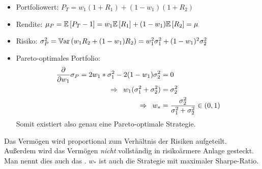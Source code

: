 \begin{description}
	\begin{itemize}
		\item Portfoliowert: $P_T = w_1 (1+R_1) + (1-w_1)(1+R_2)$
		\item Rendite: $\mu_P = \EW[P_T - 1] = w_1 \EW[R_1] + (1-w_1) \EW[R_2] = \mu$
		\item Risiko: $\sigma_P^2 = \Var[w_1 R_2 + (1-w_1) R_2] = w_1^2 \sigma_1^2 + (1-w_1)^2 \sigma_2^2$
		\item Pareto-optimales Portfolio:
		\begin{equation*}
			\begin{aligned}
			\partdiff{w_1} \sigma_P = 2w_1 * \sigma_1^2 - 2(1-w_1)\sigma_2^2 &= 0 \\
			\follows w_1 ( \sigma_1^2 + \sigma_2^2) &= \sigma_2^2 \\
			\follows w_\ast &= \frac{\sigma_2^2}{\sigma_1^2 + \sigma_2^2} \in (0,1)
			\end{aligned}
		\end{equation*}
		Somit existiert also genau eine Pareto-optimale Strategie.
	\end{itemize}
	Das Vermögen wird proportional zum Verhältnis der Risiken aufgeteilt. Außerdem wird das Vermögen \textit{nicht} vollständig in risikoärmere Anlage gesteckt. Man nennt dies auch das . $w_\ast$ ist auch die Strategie mit maximaler Sharpe-Ratio.
\end{description}